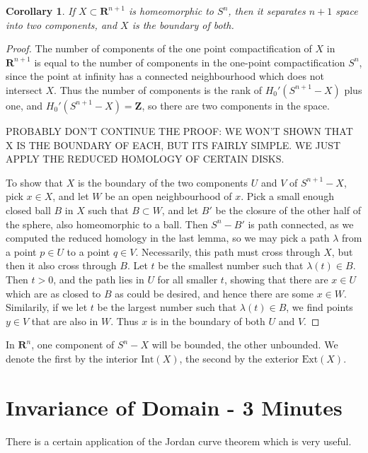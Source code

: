\documentclass{article}
\theoremstyle{plain}
\newtheorem{corollary}[theorem]{Corollary}
\begin{document}
\begin{corollary}
    If $X \subset \mathbf{R}^{n+1}$ is homeomorphic to $S^n$, then it separates $n+1$ space into two components, and $X$ is the boundary of both.
\end{corollary}
\begin{proof}
    The number of components of the one point compactification of $X$ in $\mathbf{R}^{n+1}$ is equal to the number of components in the one-point compactification $S^n$, since the point at infinity has a connected neighbourhood which does not intersect $X$. Thus the number of components is the rank of $H_0'(S^{n+1} - X)$ plus one, and $H_0'(S^{n+1} - X) = \mathbf{Z}$, so there are two components in the space.

    PROBABLY DON'T CONTINUE THE PROOF: WE WON'T SHOWN THAT X IS THE BOUNDARY OF EACH, BUT ITS FAIRLY SIMPLE. WE JUST APPLY THE REDUCED HOMOLOGY OF CERTAIN DISKS.

    To show that $X$ is the boundary of the two components $U$ and $V$ of $S^{n+1} - X$, pick $x \in X$, and let $W$ be an open neighbourhood of $x$. Pick a small enough closed ball $B$ in $X$ such that $B \subset W$, and let $B'$ be the closure of the other half of the sphere, also homeomorphic to a ball. Then $S^n - B'$ is path connected, as we computed the reduced homology in the last lemma, so we may pick a path $\lambda$ from a point $p \in U$ to a point $q \in V$. Necessarily, this path must cross through $X$, but then it also cross through $B$. Let $t$ be the smallest number such that $\lambda(t) \in B$. Then $t > 0$, and the path lies in $U$ for all smaller $t$, showing that there are $x \in U$ which are as closed to $B$ as could be desired, and hence there are some $x \in W$. Similarily, if we let $t$ be the largest number such that $\lambda(t) \in B$, we find points $y \in V$ that are also in $W$. Thus $x$ is in the boundary of both $U$ and $V$.
\end{proof}

In $\mathbf{R}^n$, one component of $S^n - X$ will be bounded, the other unbounded. We denote the first by the interior $\text{Int}(X)$, the second by the exterior $\text{Ext}(X)$.

\section{Invariance of Domain - 3 Minutes}

There is a certain application of the Jordan curve theorem which is very useful.
\end{document}

